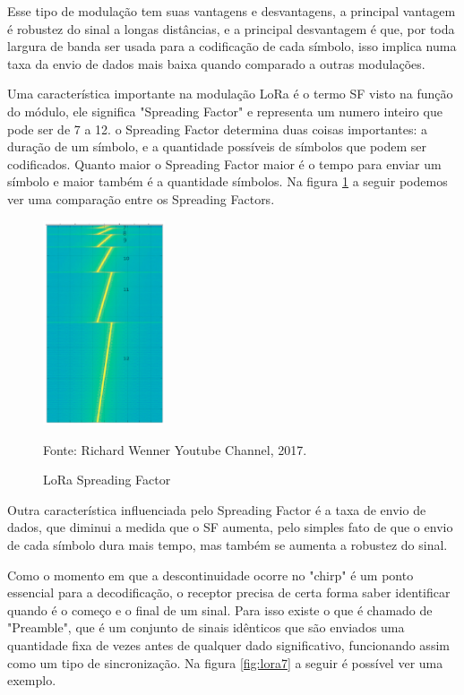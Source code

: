 Esse tipo de modulação tem suas vantagens e desvantagens, a principal vantagem é robustez do sinal
a longas distâncias, e a principal desvantagem é que, por toda largura de banda ser usada para a codificação de cada símbolo, isso implica numa taxa da envio de dados mais baixa quando comparado
a outras modulações.

Uma característica importante na modulação LoRa é o termo SF visto na função do módulo, ele significa
"Spreading Factor" e representa um numero inteiro que pode ser de 7 a 12. o Spreading Factor determina
duas coisas importantes: a duração de um símbolo, e a quantidade possíveis de símbolos que podem ser
codificados. Quanto maior o Spreading Factor maior é o tempo para enviar um símbolo e maior também é
a quantidade símbolos. Na figura \ref{fig:lora6} a seguir podemos ver uma comparação entre os Spreading
Factors. \cite{8067462}

\newpage

\begin{figure}[H]
    \centering
	\caption{LoRa Spreading Factor}
    \includegraphics[width=0.32\textwidth]{img/lora6.png}
    \label{fig:lora6}
    
    Fonte: Richard Wenner Youtube Channel, 2017.
\end{figure}

Outra característica influenciada pelo Spreading Factor é a taxa de envio de dados, que diminui a
medida que o SF aumenta, pelo simples fato de que o envio de cada símbolo dura mais tempo, mas também
se aumenta a robustez do sinal.

Como o momento em que a descontinuidade ocorre no "chirp" é um ponto essencial para a decodificação,
o receptor precisa de certa forma saber identificar quando é o começo e o final de um sinal. Para isso
existe o que é chamado de "Preamble", que é um conjunto de sinais idênticos que são enviados uma quantidade fixa de vezes antes de qualquer dado significativo, funcionando assim como um tipo de sincronização. Na figura \ref{fig:lora7} a seguir é possível ver uma exemplo. \cite{8067462}

